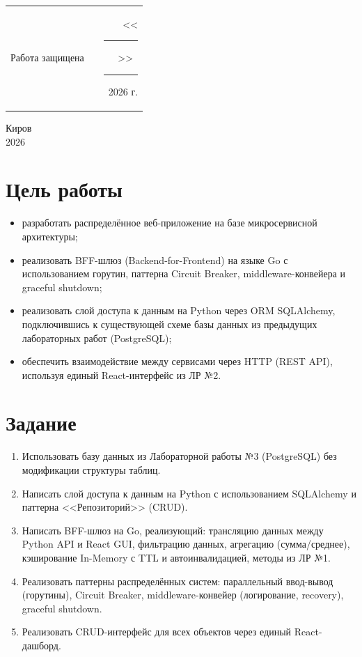 \documentclass[oneside,a4paper,14pt]{extarticle}
\begin{document}
\noindent
\begin{tabular}{lp{58mm}r}
  Работа защищена &  & \hspace{13mm}<<\rule[-1mm]{5mm}{0.10mm}\/>>\ \rule[-1mm]{30mm}{0.10mm}\ 2026 г.
\end{tabular}
\vfill

\begin{center}
  Киров\\
  2026
\end{center}

\newpage\thispagestyle{plain}
\newpage

\section{Цель работы}
\begin{itemize}
  \item[$-$] разработать распределённое веб-приложение на базе микросервисной архитектуры;
  \item[$-$] реализовать BFF-шлюз (Backend-for-Frontend) на языке Go с использованием горутин, паттерна Circuit Breaker, middleware-конвейера и graceful shutdown;
  \item[$-$] реализовать слой доступа к данным на Python через ORM SQLAlchemy, подключившись к существующей схеме базы данных из предыдущих лабораторных работ (PostgreSQL);
  \item[$-$] обеспечить взаимодействие между сервисами через HTTP (REST API), используя единый React-интерфейс из ЛР №2.
\end{itemize}

\section{Задание}
\begin{enumerate}
  \item Использовать базу данных из Лабораторной работы №3 (PostgreSQL) без модификации структуры таблиц.
  \item Написать слой доступа к данным на Python с использованием SQLAlchemy и паттерна <<Репозиторий>> (CRUD).
  \item Написать BFF-шлюз на Go, реализующий: трансляцию данных между Python API и React GUI, фильтрацию данных, агрегацию (сумма/среднее), кэширование In-Memory с TTL и автоинвалидацией, методы из ЛР №1.
  \item Реализовать паттерны распределённых систем: параллельный ввод-вывод (горутины), Circuit Breaker, middleware-конвейер (логирование, recovery), graceful shutdown.
  \item Реализовать CRUD-интерфейс для всех объектов через единый React-дашборд.
\end{enumerate}
\end{document}

